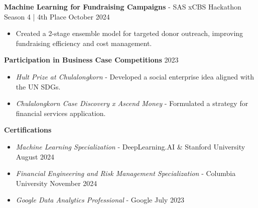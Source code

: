 \documentclass[a4paper, 11pt]{article}
\begin{document}
\textbf{Machine Learning for Fundraising Campaigns} - SAS xCBS Hackathon Season 4 | 4th Place \hfill October 2024
\begin{itemize}[noitemsep, topsep=0pt, partopsep=0pt, parsep=0pt]
    \item Created a 2-stage ensemble model for targeted donor outreach, improving fundraising efficiency and cost management.
\end{itemize}

\vspace{3pt}


\textbf{Participation in Business Case Competitions} \hfill 2023
\begin{itemize}[noitemsep, topsep=0pt, partopsep=0pt, parsep=0pt]
    \item \textit{Hult Prize at Chulalongkorn} - Developed a social enterprise idea aligned with the UN SDGs.
    \item \textit{Chulalongkorn Case Discovery x Ascend Money} - Formulated a strategy for financial services application.
\end{itemize}

\vspace{3pt}

\textbf{Certifications}
\begin{itemize}[noitemsep, topsep=0pt, partopsep=0pt, parsep=0pt]
    \item \textit{Machine Learning Specialization} - DeepLearning.AI \& Stanford University \hfill August 2024
    \item \textit{Financial Engineering and Risk Management Specialization} - Columbia University \hfill November 2024
    \item \textit{Google Data Analytics Professional} - Google \hfill July 2023
\end{itemize}
\end{document}
